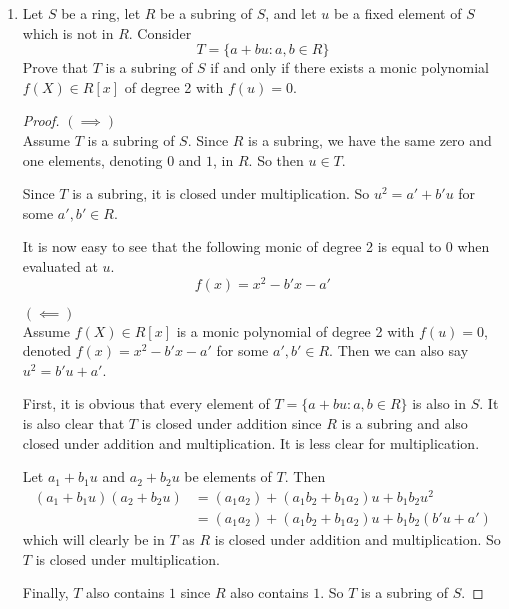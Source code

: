 \documentclass[12pt]{article}
\begin{document}
\begin{enumerate}
\begin{proof}
			This is well defined, as every $a'_n$ will be constructed with a sum of finite terms, all of which defined in sequence.
			
			We have now defined every $a'_n$ so that $ff^{-1}=1$, making $f$ a unit in $S$.
		\end{proof}
		
		
		\item Let $S$ be a ring, let $R$ be a subring of $S$, and let $u$ be a fixed element of $S$ which is not in $R$. Consider
		\[ T = \{a+bu : a,b\in R \}\]
		Prove that $T$ is a subring of $S$ if and only if there exists a monic polynomial $f(X) \in R[x]$ of degree 2 with $f(u) = 0$.
		
		\begin{proof}
			$(\implies)$\\
			Assume $T$ is a subring of $S$. Since $R$ is a subring, we have the same zero and one elements, denoting $0$ and $1$, in $R$. So then $u \in T$.
			
			Since $T$ is a subring, it is closed under multiplication. So $u^2 = a'+b'u$ for some $a',b' \in R$.
			
			It is now easy to see that the following monic of degree 2 is equal to 0 when evaluated at $u$.
			\[f(x) = x^2 - b'x-a'\]

			$(\impliedby)$\\
			Assume $f(X) \in R[x]$ is a monic polynomial of degree 2 with $f(u)=0$, denoted $f(x) = x^2 -b'x -a'$ for some $a',b' \in R$. Then we can also say $u^2 = b'u + a'$.
			
			First, it is obvious that every element of $T = \{a+bu : a,b \in R\}$ is also in $S$. It is also clear that $T$ is closed under addition since $R$ is a subring and also closed under addition and multiplication. It is less clear for multiplication.
			
			Let $a_1 +b_1u$ and $a_2 +b_2u$ be elements of $T$. Then 
			\begin{align*}
				(a_1 +b_1u)(a_2 +b_2u) &= (a_1a_2) + (a_1b_2 + b_1a_2)u + b_1b_2u^2\\
				& = (a_1a_2) + (a_1b_2 + b_1a_2)u + b_1b_2(b'u+a')
			\end{align*}
			which will clearly be in $T$ as $R$ is closed under addition and multiplication. So $T$ is closed under multiplication.
			
			Finally, $T$ also contains $1$ since $R$ also contains $1$. So $T$ is a subring of $S$.
		\end{proof}
		

\end{enumerate}
\end{document}
